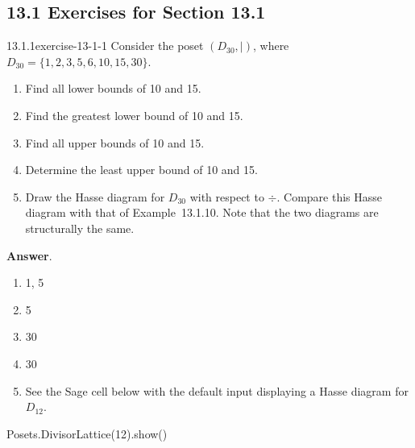 \documentclass[twoside,10pt,]{book}
\numberwithin{equation}{section}
\begin{document}
\subsection*{13.1 Exercises for Section 13.1}
\begin{divisionsolution}{13.1.1}{}{exercise-13-1-1}%
\hypertarget{p-4792}{}%
Consider the poset \((D_{30},\mid)\), where \(D_{30} = \{1,2, 3, 5, 6, 10, 15, 30\}\).\leavevmode%
\begin{enumerate}[label=(\alph*)]
\item\hypertarget{li-2184}{}\hypertarget{p-4793}{}%
Find all lower bounds of 10 and 15.%
\item\hypertarget{li-2185}{}\hypertarget{p-4794}{}%
Find the greatest lower bound  of 10 and 15.%
\item\hypertarget{li-2186}{}\hypertarget{p-4795}{}%
Find all upper bounds of 10 and 15.%
\item\hypertarget{li-2187}{}\hypertarget{p-4796}{}%
Determine the least upper bound  of 10 and 15.%
\item\hypertarget{li-2188}{}\hypertarget{p-4797}{}%
Draw the Hasse diagram for \(D_{30}\) with respect to \(\div\). Compare this Hasse diagram with that of Example~13.1.10. Note that the two diagrams are structurally the same.%
\end{enumerate}
%
\par\smallskip%
\noindent\textbf{Answer}.\quad%
\hypertarget{p-4798}{}%
\leavevmode%
\begin{multicols}{2}
\begin{enumerate}[label=(\alph*)]
\item\hypertarget{li-2189}{}\hypertarget{p-4799}{}%
1, 5%
\item\hypertarget{li-2190}{}\hypertarget{p-4800}{}%
5%
\item\hypertarget{li-2191}{}\hypertarget{p-4801}{}%
30%
\item\hypertarget{li-2192}{}\hypertarget{p-4802}{}%
30%
\item\hypertarget{li-2193}{}\hypertarget{p-4803}{}%
See the Sage cell below with the default input displaying a Hasse diagram for \(D_{12}\).%
\end{enumerate}
\end{multicols}
%
\begin{sageinput}
Posets.DivisorLattice(12).show()
\end{sageinput}
\begin{sageoutput}

\end{sageoutput}
\end{divisionsolution}%
\end{document}
